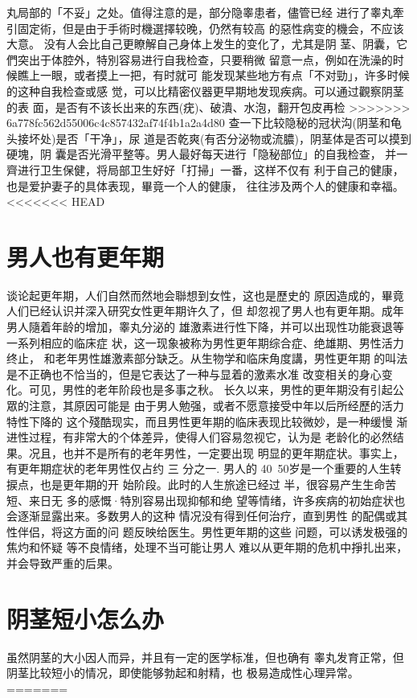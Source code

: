 \documentclass[12pt,UTF8]{ctexbook}
\begin{document}
丸局部的「不妥」之处。值得注意的是，部分隐睾患者，儘管已经
进行了睾丸牽引固定術，但是由于手術时機選擇较晚，仍然有较高
的惡性病变的機会，不应该大意。
没有人会比自己更瞭解自己身体上发生的变化了，尤其是阴
茎、阴囊，它們突出于体腔外，特別容易进行自我检查，只要稍微
留意一点，例如在洗澡的时候瞧上一眼，或者摸上一把，有时就可
能发现某些地方有点「不对勁」，许多时候的这种自我检查或感
觉，可以比精密仪器更早期地发现疾病。可以通过觀察阴茎的表
面，是否有不该长出来的东西(疣)、破潰、水泡，翻开包皮再检
>>>>>>> 6a778fc562d55006c4c857432af74f4b1a2a4d80
查一下比较隐秘的冠状沟(阴茎和龟头接坏处)是否「干净」，尿
道是否乾爽(有否分泌物或流膿)，阴茎体是否可以摸到硬塊，阴
囊是否光滑平整等。男人最好每天进行「隐秘部位」的自我检查，
并一齊进行卫生保健，将局部卫生好好「打掃」一番，这样不仅有
利于自己的健康，也是爱护妻子的具体表现，畢竟一个人的健康，
往往涉及两个人的健康和幸福。
<<<<<<< HEAD

\section{男人也有更年期}
谈论起更年期，人们自然而然地会聯想到女性，这也是歷史的
原因造成的，畢竟人们已经认识并深入研究女性更年期许久了，但
却忽视了男人也有更年期。成年男人隨着年龄的增加，睾丸分泌的
雄激素进行性下降，并可以出现性功能衰退等一系列相应的临床症
状，这一现象被称为男性更年期综合症、绝雄期、男性活力终止，
和老年男性雄激素部分缺乏。从生物学和临床角度講，男性更年期
的叫法是不正确也不恰当的，但是它表达了一种与显着的激素水准
改变相关的身心变化。可见，男性的老年阶段也是多事之秋。
长久以来，男性的更年期没有引起公眾的注意，其原因可能是
由于男人勉强，或者不愿意接受中年以后所经歷的活力特性下降的
这个殘酷现实，而且男性更年期的临床表现比较微妙，是一种缓慢
渐进性过程，有非常大的个体差异，使得人们容易忽视它，认为是
老龄化的必然结果。况且，也并不是所有的老年男性，一定要出现
明显的更年期症状。事实上，有更年期症状的老年男性仅占约 三
分之一.
男人的 40~50岁是一个重要的人生转捩点，也是更年期的开
始阶段。此时的人生旅途已经过
半，很容易产生生命苦短、来日无
多的感慨·特別容易出现抑郁和绝
望等情绪，许多疾病的初始症状也
会逐渐显露出来。多数男人的这种
情况没有得到任何治疗，直到男性
的配偶或其性伴侣，将这方面的问
题反映给医生。男性更年期的这些
问题，可以诱发极强的焦灼和怀疑
等不良情绪，处理不当可能让男人
难以从更年期的危机中掙扎出来，
并会导致严重的后果。

\section{阴茎短小怎么办}
虽然阴茎的大小因人而异，并且有一定的医学标准，但也确有
睾丸发育正常，但阴茎比较短小的情况，即使能够勃起和射精，也
极易造成性心理异常。
=======
\end{document}
